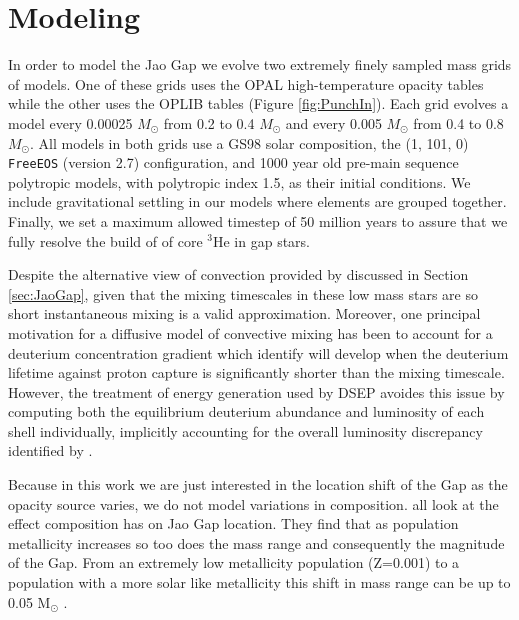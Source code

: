 \section{Modeling}\label{sec:modeling}
In order to model the Jao Gap we evolve two extremely finely sampled mass grids
of models. One of these grids uses the OPAL high-temperature opacity tables
while the other uses the OPLIB tables (Figure \ref{fig:PunchIn}). Each grid
evolves a model every 0.00025 $M_{\odot}$ from 0.2 to 0.4 $M_{\odot}$ and every
0.005 $M_{\odot}$ from 0.4 to 0.8 $M_{\odot}$. All models in both grids use a
GS98 solar composition, the (1, 101, 0) \texttt{FreeEOS} (version
{\color{red}2.7}) configuration, and 1000 year old pre-main sequence polytropic
models, with polytropic index 1.5, as their initial conditions. We
include gravitational settling in our models where elements are grouped
together. Finally, we set a maximum allowed timestep of 50 million years to
assure that we fully resolve the build of of core $^{3}$He in gap stars.

Despite the alternative view of convection provided by
\citet{MacDonald2018} discussed in Section \ref{sec:JaoGap}, given that the
mixing timescales in these low mass stars are so short \citep[between $10^{7}$s
and $10^{8}$s per][Figure 2 \& Equation 39, which present the
averaged velocity over the convection zone]{Jermyn2022} instantaneous mixing is a valid
approximation. Moreover, one principal motivation for a diffusive model of
convective mixing has been to account for a deuterium concentration gradient
which \citet{Chabrier1997} identify will develop when the deuterium lifetime
against proton capture is significantly shorter than the mixing timescale.
However, the treatment of energy generation used by DSEP \citep{Bahcall2001}
avoides this issue by computing both the equilibrium deuterium abundance and
luminosity of each shell individually, implicitly accounting for the overall
luminosity discrepancy identified by \citeauthor{Chabrier1997}.

Because in this work we are just interested in the location shift of the Gap as
the opacity source varies, we do not model variations in composition.
\citet{Mansfield2021,Jao2020,Feiden2021} all look at the effect composition has
on Jao Gap location. They find that as population metallicity increases so too
does the mass range and consequently the magnitude of the Gap. From an extremely
low metallicity population (Z=0.001) to a population with a more solar like
metallicity this shift in mass range can be up to 0.05 M$_{\odot}$
\citep{Mansfield2021}.

